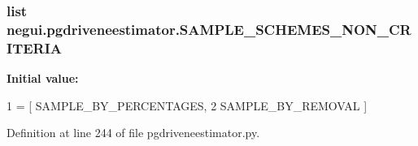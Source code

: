 \subsubsection[{\texorpdfstring{S\+A\+M\+P\+L\+E\+\_\+\+S\+C\+H\+E\+M\+E\+S\+\_\+\+N\+O\+N\+\_\+\+C\+R\+I\+T\+E\+R\+IA}{SAMPLE_SCHEMES_NON_CRITERIA}}]{\setlength{\rightskip}{0pt plus 5cm}list negui.\+pgdriveneestimator.\+S\+A\+M\+P\+L\+E\+\_\+\+S\+C\+H\+E\+M\+E\+S\+\_\+\+N\+O\+N\+\_\+\+C\+R\+I\+T\+E\+R\+IA}\hypertarget{namespacenegui_1_1pgdriveneestimator_a2d9d6cbe867f7222f090e8fa43d5c04d}{}\label{namespacenegui_1_1pgdriveneestimator_a2d9d6cbe867f7222f090e8fa43d5c04d}
{\bfseries Initial value\+:}
\begin{DoxyCode}
1 = [ SAMPLE\_BY\_PERCENTAGES, 
2                                     SAMPLE\_BY\_REMOVAL ]
\end{DoxyCode}


Definition at line 244 of file pgdriveneestimator.\+py.

